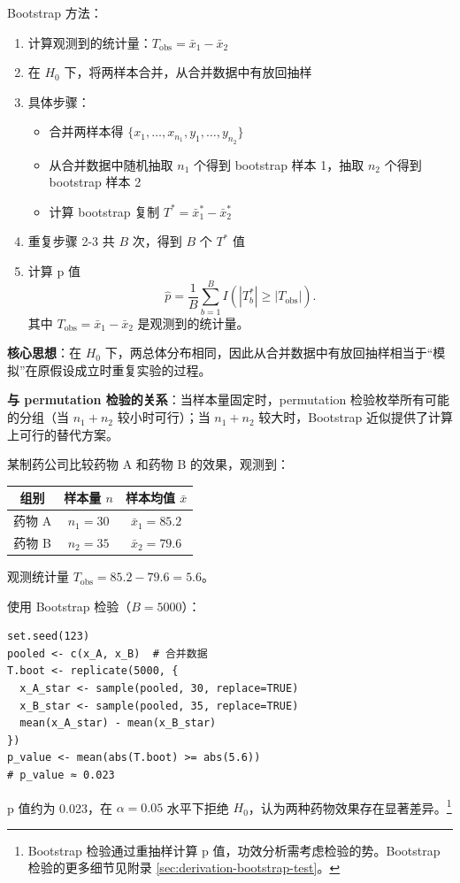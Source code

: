 Bootstrap 方法：
\begin{enumerate}
\item 计算观测到的统计量：$T_{\mathrm{obs}} = \bar{x}_1 - \bar{x}_2$
\item 在 $H_0$ 下，将两样本合并，从合并数据中有放回抽样
\item 具体步骤：
   \begin{itemize}
   \item 合并两样本得 $\{x_1, \ldots, x_{n_1}, y_1, \ldots, y_{n_2}\}$
   \item 从合并数据中随机抽取 $n_1$ 个得到 bootstrap 样本 1，抽取 $n_2$ 个得到 bootstrap 样本 2
   \item 计算 bootstrap 复制 $T^* = \bar{x}_1^* - \bar{x}_2^*$
   \end{itemize}
\item 重复步骤 2-3 共 $B$ 次，得到 $B$ 个 $T^*$ 值
\item 计算 p 值
\[
\hat{p} = \frac{1}{B}\sum_{b=1}^B I\!\left(|T_b^*| \geq |T_{\mathrm{obs}}|\right).
\tag{4.9.2}\label{eq:bootstrap-pvalue}
\]
其中 $T_{\mathrm{obs}} = \bar{x}_1 - \bar{x}_2$ 是观测到的统计量。
\end{enumerate}

\textbf{核心思想}：在 $H_0$ 下，两总体分布相同，因此从合并数据中有放回抽样相当于``模拟''在原假设成立时重复实验的过程。

\textbf{与 permutation 检验的关系}：当样本量固定时，permutation 检验枚举所有可能的分组（当 $n_1+n_2$ 较小时可行）；当 $n_1+n_2$ 较大时，Bootstrap 近似提供了计算上可行的替代方案。

\begin{example}\label{ex:two-sample-bootstrap-test}
某制药公司比较药物 A 和药物 B 的效果，观测到：

\begin{center}
\begin{tabular}{c|c|c}
\hline
组别 & 样本量 $n$ & 样本均值 $\bar{x}$ \\ \hline
药物 A & $n_1=30$ & $\bar{x}_1=85.2$ \\
药物 B & $n_2=35$ & $\bar{x}_2=79.6$ \\ \hline
\end{tabular}
\end{center}

观测统计量 $T_{\mathrm{obs}} = 85.2 - 79.6 = 5.6$。

使用 Bootstrap 检验（$B=5000$）：
\begin{verbatim}
set.seed(123)
pooled <- c(x_A, x_B)  # 合并数据
T.boot <- replicate(5000, {
  x_A_star <- sample(pooled, 30, replace=TRUE)
  x_B_star <- sample(pooled, 35, replace=TRUE)
  mean(x_A_star) - mean(x_B_star)
})
p_value <- mean(abs(T.boot) >= abs(5.6))
# p_value ≈ 0.023
\end{verbatim}

p 值约为 0.023，在 $\alpha=0.05$ 水平下拒绝 $H_0$，认为两种药物效果存在显著差异。\footnote{ Bootstrap 检验通过重抽样计算 p 值，功效分析需考虑检验的势。Bootstrap 检验的更多细节见附录 \cref{sec:derivation-bootstrap-test}。}
\end{example}

